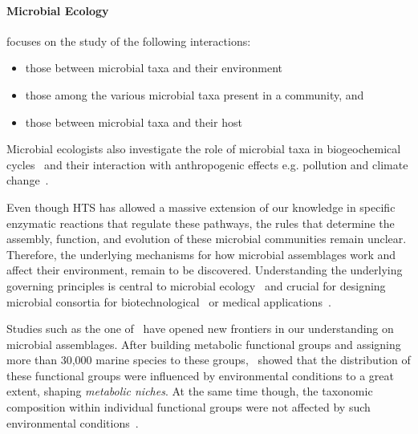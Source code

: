      \paragraph{Microbial Ecology} focuses on the study of the following interactions: 
      \begin{itemize}
         \setlength\itemsep{0.05em}
         \item those between microbial taxa and their environment
         \item those among the various microbial taxa present in a community, and
         \item those between microbial taxa and their host~\citep{isme}
      \end{itemize}

      Microbial ecologists also investigate the role of microbial taxa in 
      biogeochemical cycles~\citep{falkowski2008microbial} and their interaction 
      with anthropogenic effects e.g. pollution and climate change~\citep{cavicchioli2019scientists}.

      Even though HTS has allowed a massive extension of our knowledge in  
      specific enzymatic reactions that regulate these pathways, the rules that determine 
      the assembly, function, and evolution of these microbial communities remain unclear. 
      Therefore, the underlying mechanisms for how microbial assemblages work and affect their environment, remain to be discovered.
      Understanding the underlying governing principles is central to microbial ecology~\citep{giri2021metabolic} and crucial for designing microbial consortia for biotechnological~\citep{giri2020harnessing} or medical applications~\citep{kong2018designing}.

      Studies such as the one of~\citeauthor{louca2016decoupling}
      have opened new frontiers in our understanding on microbial assemblages. 
      After building metabolic functional groups and assigning more than 30,000 marine 
      species to these groups,~\citeauthor{louca2016decoupling} showed 
      that the distribution of these functional groups were influenced by environmental 
      conditions to a great extent, shaping \textit{metabolic niches}.
      At the same time though, the taxonomic composition within individual functional groups
      were not affected by such environmental conditions~\citep{louca2016decoupling}.

